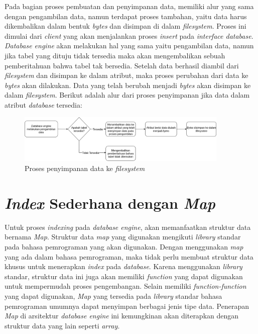 Pada bagian proses pembuatan dan penyimpanan data, memiliki alur yang sama dengan pengambilan data, namun terdapat proses tambahan,
yaitu data harus dikembalikan dalam bentuk \emph{bytes} dan disimpan di dalam \emph{filesystem}. Proses ini dimulai dari \emph{client} 
yang akan menjalankan proses \emph{insert} pada \emph{interface database}. \emph{Database engine} akan melakukan hal yang sama yaitu
pengambilan data, namun jika tabel yang dituju tidak tersedia maka akan mengembalikan sebuah pemberitahuan bahwa tabel tak bersedia. 
Setelah data berhasil diambil dari \emph{filesystem} dan disimpan ke dalam atribut, maka proses perubahan dari data ke \emph{bytes} akan dilakukan.
Data yang telah berubah menjadi \emph{bytes} akan disimpan ke dalam \emph{filesystem}. Berikut adalah alur dari proses penyimpanan jika data 
dalam atribut \emph{database} tersedia:


\begin{figure}[H]
  \centering{}
	\includegraphics[width=0.9\textwidth]{gambar/bab3/proses-penyimpanan-data-filesystem}
  \caption{Proses penyimpanan data ke \emph{filesystem}}
\end{figure}

\section{\emph{Index} Sederhana dengan \emph{Map}}
Untuk proses \emph{indexing} pada \emph{database engine}, akan memanfaatkan struktur data bernama \emph{Map}. Struktur data \emph{map} yang digunakan mengikuti \emph{library} 
standar pada bahasa pemrograman yang akan digunakan. Dengan menggunakan \emph{map} yang ada dalam bahasa pemrograman, maka tidak perlu membuat struktur data khusus
untuk menerapkan \emph{index} pada \emph{database}. Karena menggunakan \emph{library} standar, struktur data ini juga akan memiliki \emph{function} yang dapat digunakan untuk mempermudah
proses pengembangan. Selain memiliki \emph{function-function} yang dapat digunakan, \emph{Map} yang tersedia pada \emph{library} standar bahasa pemrograman umumnya dapat 
menyimpan berbagai jenis tipe data. Penerapan \emph{Map} di arsitektur \emph{database engine} ini kemungkinan akan diterapkan dengan struktur data yang lain seperti \emph{array}.

